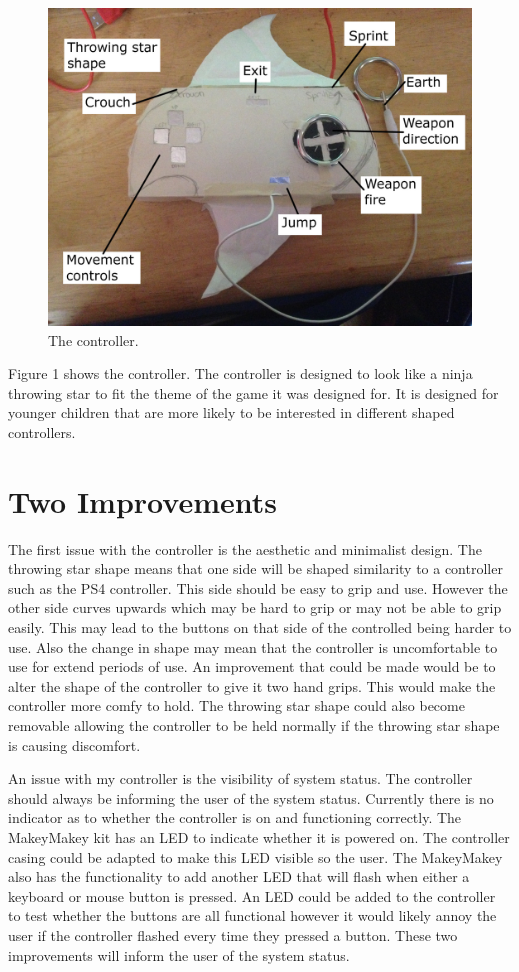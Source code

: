 \documentclass{scrartcl}
\begin{document}
\begin{figure}[h]
	\includegraphics[width=1.0\linewidth]{Controller.jpg}
	\caption{ The controller.}
\end{figure}
Figure 1 shows the controller. The controller is designed to look like a ninja throwing star to fit the theme of the game it was designed for. It is designed for younger children that are more likely to be interested in different shaped controllers.


\section{Two Improvements}

The first issue with the controller is the aesthetic and minimalist design. The throwing star shape means that one side will be shaped similarity to a controller such as the PS4 controller. This side should be easy to grip and use. However the other side curves upwards which may be hard to grip or may not be able to grip easily. This may lead to the buttons on that side of the controlled being harder to use. Also the change in shape may mean that the controller is uncomfortable to use for extend periods of use. An improvement that could be made would be to alter the shape of the controller to give it two hand grips. This would make the controller more comfy to hold. The throwing star shape could also become removable allowing the controller to be held normally if the throwing star shape is causing discomfort.  

An issue with my controller is the visibility of system status. The controller should always be informing the user of the system status. Currently there is no indicator as to whether the controller is on and functioning correctly. The MakeyMakey kit has an LED to indicate whether it is powered on. The controller casing could be adapted to make this LED visible so the user. The MakeyMakey also has the functionality to add another LED that will flash when either a keyboard or mouse button is pressed. An LED could be added to the controller to test whether the buttons are all functional however it would likely annoy the user if the controller flashed every time they pressed a button. These two improvements will inform the user of the system status. 
\end{document}
